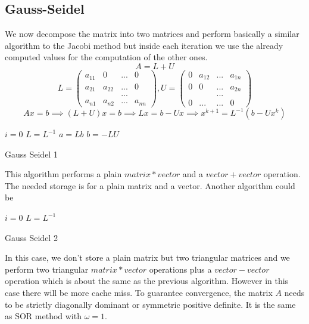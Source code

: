 \documentclass[a4paper]{report}
\begin{document}
\subsection{Gauss-Seidel}
We now decompose the matrix into two matrices and perform basically a similar algorithm to the Jacobi method but inside each iteration we use the already computed values for the computation of the other ones.
\[
A=L+U
\]
\[
L=\left(
\begin{matrix}
a_{11} & 0      & ... & 0 \\
a_{21} & a_{22} & ... & 0\\
& & ... &\\
a_{n1} & a_{n2} & ... & a_{nn}
\end{matrix}
\right) ,
U=\left(
\begin{matrix}
0 & a_{12} & ...    & a_{1n}\\
0 & 0      & ... & a_{2n}   \\
&&...&\\
0 & ...    &    ...     & 0
\end{matrix}
\right)
\]
\[
Ax=b \implies (L+U)x=b \implies Lx=b-Ux
\implies x^{k+1}=L^{-1}(b-Ux^k)
\]
\begin{algorithm}[H]
 $i=0$\;
 $L=L^{-1}$\;
 $a=Lb$\;
 $b=-LU$\;
 \caption{Gauss Seidel 1}
\end{algorithm}
This algorithm performs a plain $matrix * vector$ and a $vector+vector$ operation. The needed storage is for a plain matrix and a vector. Another algorithm could be
\\
\begin{algorithm}[H]
 $i=0$\;
 $L=L^{-1}$\;
 \caption{Gauss Seidel 2}
\end{algorithm}
In this case, we don't store a plain matrix but two triangular matrices and we perform two triangular $matrix* vector$ operations plus a $vector-vector$ operation which is about the same as the previous algorithm. However in this case there will be more cache miss.
To guarantee convergence, the matrix $A$ needs to be strictly diagonally dominant or symmetric positive definite. It is the same as SOR method with $\omega =1$.
\end{document}
